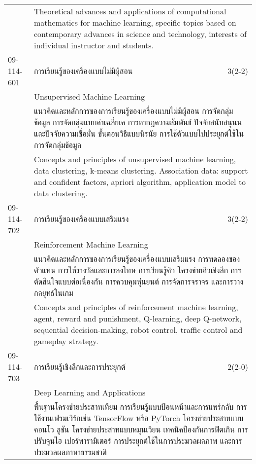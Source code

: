 \begin{longtable}{p{}p{}r{}}
&  \multicolumn{2}{p{0.75\textwidth}}{Theoretical advances and applications of computational mathematics for machine learning, specific topics based on contemporary advances in science and technology, interests of individual instructor and students.} \vspace{8mm} \\*
09-114-601 & การเรียนรู้ของเครื่องแบบไม่มีผู้สอน & 3(2-2)\\*
 & Unsupervised Machine Learning & \phantom{x} \vspace{3mm} \\*
&  \multicolumn{2}{p{0.75\textwidth}}{แนวคิดและหลักการของการเรียนรู้ของเครื่องแบบไม่มีผู้สอน การจัดกลุ่มข้อมูล การจัดกลุ่มแบบค่าเฉลี่ยเค การหากฎความสัมพันธ์ ปัจจัยสนับสนุนนและปัจจัยความเชื่อมั่น ขั้นตอนวิธีแบบนิรนัย การใช้ตัวแบบไปประยุกต์ใช้ในการจัดกลุ่มข้อมูล} \vspace{3mm} \\*
&  \multicolumn{2}{p{0.75\textwidth}}{Concepts and principles of unsupervised machine learning, data clustering, k-means clustering. Association data: support and confident factors, apriori algorithm, application model to data clustering.} \vspace{8mm} \\*
09-114-702 & การเรียนรู้ของเครื่องแบบเสริมแรง & 3(2-2)\\*
 & Reinforcement Machine Learning & \phantom{x} \vspace{3mm} \\*
&  \multicolumn{2}{p{0.75\textwidth}}{แนวคิดและหลักการของการเรียนรู้ของเครื่องแบบเสริมแรง การทดลองของตัวแทน การให้รางวัลและการลงโทษ การเรียนรู้คิว โครงข่ายคิวเชิงลึก การตัดสินใจแบบต่อเนื่องกัน การควบคุมหุ่นยนต์ การจัดการจราจร และการวางกลยุทธ์ในเกม} \vspace{3mm} \\*
&  \multicolumn{2}{p{0.75\textwidth}}{Concepts and principles of reinforcement machine learning, agent, reward and punishment, Q-learning, deep Q-network, sequential decision-making, robot control, traffic control and gameplay strategy.} \vspace{8mm} \\*
09-114-703 & การเรียนรู้เชิงลึกและการประยุกต์   & 2(2-0)\\*
 & Deep Learning and Applications & \phantom{x} \vspace{3mm} \\*
&  \multicolumn{2}{p{0.75\textwidth}}{พื้นฐานโครงข่ายประสาทเทียม การเรียนรู้แบบป้อนหน้าและการแพร่กลับ การใช้งานเฟรมเวิร์กเช่น TensorFlow หรือ PyTorch โครงข่ายประสาทแบบคอนโว ลูชัน โครงข่ายประสาทแบบหมุนเวียน เทคนิคป้องกันการฟิตเกิน การปรับจูนไฮ เปอร์พารามิเตอร์ การประยุกต์ใช้ในการประมวลผลภาพ และการประมวลผลภาษาธรรมชาติ} \vspace{3mm} \\*

\end{longtable}
